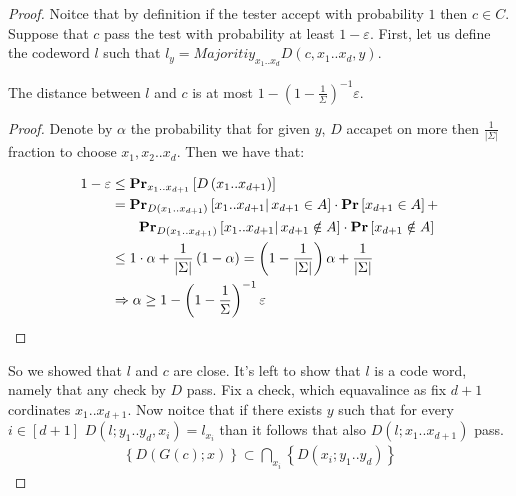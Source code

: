 \begin{proof}
  Noitce that by definition if the tester accept with probability $1$ then $c \in C$. Suppose that $c$ pass the test with probability at least $1 - \varepsilon$. First, let us define the codeword $l$ such that $ l_{y} = Majoritiy_{x_1 .. x_{d}}D\left(c, x_{1}.. x_{d},y\right)$.

  \begin{claim} 
    The distance between $l$ and $c$ is at most $ 1- \left( 1 - \frac{1}{\Sigma} \right)^{-1}\varepsilon$.  
  \end{claim}
  \begin{proof} 
    Denote by $\alpha$ the probability that for given $y$, $D$ accapet on more then $\frac{1}{|\Sigma|}$ fraction to choose $x_{1},x_{2}..x_{d}$. 
    Then we have that:  
    
    \begin{equation*}
      \begin{split}
        1 - \varepsilon  & \le \prbm{ D\left( x_1 .. x_{d+1} \right) }{x_1 .. x_{d+1}}  \\
        & = \prbcprb{  D\left( x_1 .. x_{d+1} \right)}{ x_1 .. x_{d+1}  }{ x_{d+1} \in A } + \\
        & \ \ \ \ \ \ \prbcprb{ D\left( x_1 .. x_{d+1} \right)}{ x_1 .. x_{d+1}   }{ x_{d+1} \notin A } \\
        & \le 1 \cdot \alpha +  \frac{1}{|\Sigma|}  \left( 1 - \alpha \right) = \left( 1 - \frac{1}{|\Sigma|} \right) \alpha  + \frac{1}{|\Sigma|} \\
       & \Rightarrow \alpha \ge  1- \left( 1 - \frac{1}{\Sigma} \right)^{-1}\varepsilon
      \end{split}
    \end{equation*}
  \end{proof} 

  So we showed that $l$ and $c$ are close. It's left to show that $l$ is a code word, namely that any check by $D$ pass. Fix a check, which equavalince as fix $d+1$ cordinates $x_{1} .. x_{d+1}$. Now noitce that if there exists $y$ such that for every $i \in [d+1]$ $D\left(l; y_{1} .. y_{d}, x_{i} \right) = l_{x_{i}}$ than it follows that also $D\left(l; x_{1} .. x_{d+1} \right)$ pass.  
  \begin{equation*}
    \begin{split}
      \left\{ D(G(c) ; x ) \right\} \subset \bigcap_{ x_{i} } \left\{ D\left( x_{i} ; y_{1} .. y_{d} \right)  \right\} 
    \end{split}
  \end{equation*}
\end{proof}


